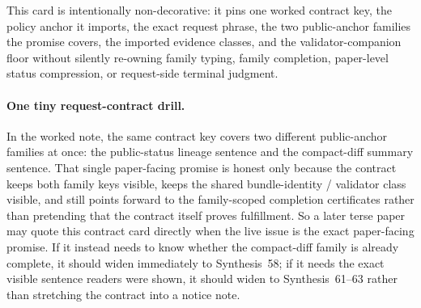 \documentclass[11pt]{article}
\begin{document}
This card is intentionally non-decorative: it pins one worked contract key, the policy anchor it imports, the exact request phrase, the two public-anchor families the promise covers, the imported evidence classes, and the validator-companion floor without silently re-owning family typing, family completion, paper-level status compression, or request-side terminal judgment.\cite{series:workedexample}

\paragraph{One tiny request-contract drill.}
In the worked note, the same contract key covers two different public-anchor families at once: the public-status lineage sentence and the compact-diff summary sentence. That single paper-facing promise is honest only because the contract keeps both family keys visible, keeps the shared bundle-identity / validator class visible, and still points forward to the family-scoped completion certificates rather than pretending that the contract itself proves fulfillment. So a later terse paper may quote this contract card directly when the live issue is the exact paper-facing promise. If it instead needs to know whether the compact-diff family is already complete, it should widen immediately to Synthesis~58; if it needs the exact visible sentence readers were shown, it should widen to Synthesis~61--63 rather than stretching the contract into a notice note.\cite{series:workedexample}
\end{document}
